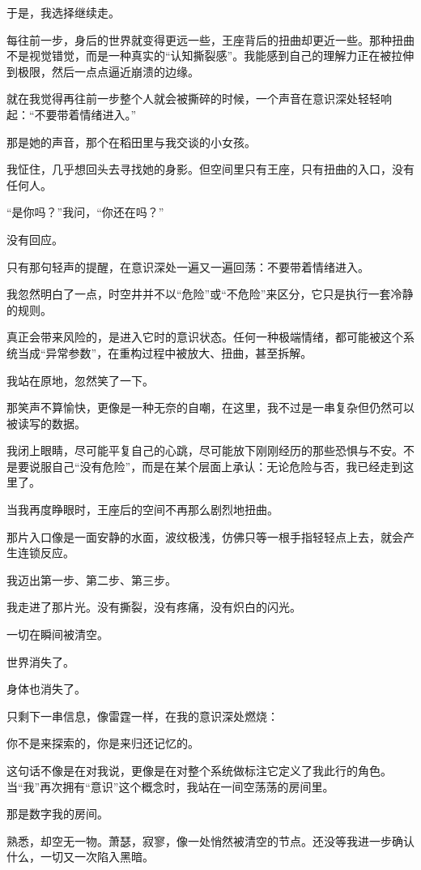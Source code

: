 于是，我选择继续走。

每往前一步，身后的世界就变得更远一些，王座背后的扭曲却更近一些。那种扭曲不是视觉错觉，而是一种真实的“认知撕裂感”。我能感到自己的理解力正在被拉伸到极限，然后一点点逼近崩溃的边缘。

就在我觉得再往前一步整个人就会被撕碎的时候，一个声音在意识深处轻轻响起：“不要带着情绪进入。”

那是她的声音，那个在稻田里与我交谈的小女孩。

我怔住，几乎想回头去寻找她的身影。但空间里只有王座，只有扭曲的入口，没有任何人。

“是你吗？”我问，“你还在吗？”

没有回应。

只有那句轻声的提醒，在意识深处一遍又一遍回荡：不要带着情绪进入。

我忽然明白了一点，时空井并不以“危险”或“不危险”来区分，它只是执行一套冷静的规则。

真正会带来风险的，是进入它时的意识状态。任何一种极端情绪，都可能被这个系统当成“异常参数”，在重构过程中被放大、扭曲，甚至拆解。

我站在原地，忽然笑了一下。

那笑声不算愉快，更像是一种无奈的自嘲，在这里，我不过是一串复杂但仍然可以被读写的数据。

我闭上眼睛，尽可能平复自己的心跳，尽可能放下刚刚经历的那些恐惧与不安。不是要说服自己“没有危险”，而是在某个层面上承认：无论危险与否，我已经走到这里了。

当我再度睁眼时，王座后的空间不再那么剧烈地扭曲。

那片入口像是一面安静的水面，波纹极浅，仿佛只等一根手指轻轻点上去，就会产生连锁反应。

我迈出第一步、第二步、第三步。

我走进了那片光。没有撕裂，没有疼痛，没有炽白的闪光。

一切在瞬间被清空。

世界消失了。

身体也消失了。

只剩下一串信息，像雷霆一样，在我的意识深处燃烧：

你不是来探索的，你是来归还记忆的。

这句话不像是在对我说，更像是在对整个系统做标注它定义了我此行的角色。当“我”再次拥有“意识”这个概念时，我站在一间空荡荡的房间里。

那是数字我的房间。

熟悉，却空无一物。萧瑟，寂寥，像一处悄然被清空的节点。还没等我进一步确认什么，一切又一次陷入黑暗。

